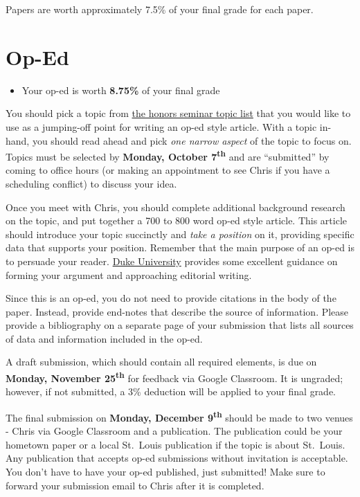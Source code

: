 \documentclass[]{book}
\newenvironment{rmdblock}[1]
  {\begin{shaded*}
  \begin{itemize}
  \renewcommand{\labelitemi}{
    \raisebox{-.7\height}[0pt][0pt]{
      {\setkeys{Gin}{width=3em,keepaspectratio}\texttt{[image: images/\#1]}}
    }
  }
  \item
  }
  {
  \end{itemize}
  \end{shaded*}
  }
\newenvironment{rmdtip}
  {\begin{rmdblock}{tip}}
  {\end{rmdblock}}
\begin{document}
Papers are worth approximately 7.5\% of your final grade for each paper.

\hypertarget{op-ed}{%
\section{Op-Ed}\label{op-ed}}

\begin{rmdtip}
Your op-ed is worth \textbf{8.75\%} of your final grade
\end{rmdtip}

You should pick a topic from \href{/honors-seminar-topics.html}{the honors seminar topic list} that you would like to use as a jumping-off point for writing an op-ed style article. With a topic in-hand, you should read ahead and pick \emph{one narrow aspect} of the topic to focus on. Topics must be selected by \textbf{Monday, October 7\textsuperscript{th}} and are ``submitted'' by coming to office hours (or making an appointment to see Chris if you have a scheduling conflict) to discuss your idea.

Once you meet with Chris, you should complete additional background research on the topic, and put together a 700 to 800 word op-ed style article. This article should introduce your topic succinctly and \emph{take a position} on it, providing specific data that supports your position. Remember that the main purpose of an op-ed is to persuade your reader. \href{https://styleguide.duke.edu/toolkits/writing-media/how-to-write-an-op-ed-article/}{Duke University} provides some excellent guidance on forming your argument and approaching editorial writing.

Since this is an op-ed, you do not need to provide citations in the body of the paper. Instead, provide end-notes that describe the source of information. Please provide a bibliography on a separate page of your submission that lists all sources of data and information included in the op-ed.

A draft submission, which should contain all required elements, is due on \textbf{Monday, November 25\textsuperscript{th}} for feedback via Google Classroom. It is ungraded; however, if not submitted, a 3\% deduction will be applied to your final grade.

The final submission on \textbf{Monday, December 9\textsuperscript{th}} should be made to two venues - Chris via Google Classroom and a publication. The publication could be your hometown paper or a local St.~Louis publication if the topic is about St.~Louis. Any publication that accepts op-ed submissions without invitation is acceptable. You don't have to have your op-ed published, just submitted! Make sure to forward your submission email to Chris after it is completed.
\end{document}

